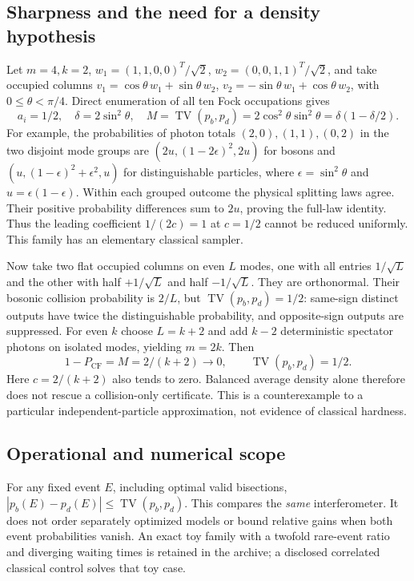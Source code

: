\documentclass[11pt,a4paper]{article}
\theoremstyle{remark}\newtheorem{remark}[theorem]{Remark}
\DeclareMathOperator{\TV}{TV}
\newcommand{\CF}{\mathrm{CF}}
\begin{document}
\subsection{Sharpness and the need for a density hypothesis}
Let $m=4,k=2$, $w_1=(1,1,0,0)^T/\sqrt2$, $w_2=(0,0,1,1)^T/\sqrt2$, and take occupied columns $v_1=\cos\theta\,w_1+\sin\theta\,w_2$, $v_2=-\sin\theta\,w_1+\cos\theta\,w_2$, with $0\le\theta<\pi/4$. Direct enumeration of all ten Fock occupations gives
\begin{equation}
 a_i=1/2,\quad\delta=2\sin^2\theta,\quad
 M=\TV(p_b,p_d)=2\cos^2\theta\sin^2\theta
 =\delta(1-\delta/2).\label{eq:sharp}
\end{equation}
For example, the probabilities of photon totals $(2,0),(1,1),(0,2)$ in the two disjoint mode groups are $(2u,(1-2\epsilon)^2,2u)$ for bosons and $(u,(1-\epsilon)^2+\epsilon^2,u)$ for distinguishable particles, where $\epsilon=\sin^2\theta$ and $u=\epsilon(1-\epsilon)$. Within each grouped outcome the physical splitting laws agree. Their positive probability differences sum to $2u$, proving the full-law identity. Thus the leading coefficient $1/(2c)=1$ at $c=1/2$ cannot be reduced uniformly. This family has an elementary classical sampler.

Now take two flat occupied columns on even $L$ modes, one with all entries $1/\sqrt L$ and the other with half $+1/\sqrt L$ and half $-1/\sqrt L$. They are orthonormal. Their bosonic collision probability is $2/L$, but $\TV(p_b,p_d)=1/2$: same-sign distinct outputs have twice the distinguishable probability, and opposite-sign outputs are suppressed. For even $k$ choose $L=k+2$ and add $k-2$ deterministic spectator photons on isolated modes, yielding $m=2k$. Then
\begin{equation}
 1-P_{\CF}=M=2/(k+2)\longrightarrow0,\qquad
 \TV(p_b,p_d)=1/2.\label{eq:spectator}
\end{equation}
Here $c=2/(k+2)$ also tends to zero. Balanced average density alone therefore does not rescue a collision-only certificate. This is a counterexample to a particular independent-particle approximation, not evidence of classical hardness.

\subsection{Operational and numerical scope}
For any fixed event $E$, including optimal valid bisections, $|p_b(E)-p_d(E)|\le\TV(p_b,p_d)$. This compares the \emph{same} interferometer. It does not order separately optimized models or bound relative gains when both event probabilities vanish. An exact toy family with a twofold rare-event ratio and diverging waiting times is retained in the archive; a disclosed correlated classical control solves that toy case.
\end{document}
